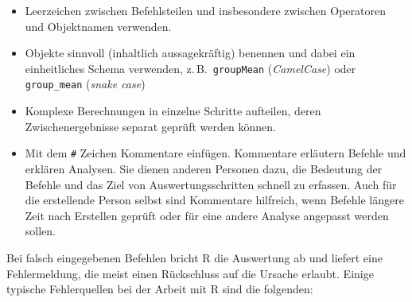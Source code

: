 \begin{itemize}
\item Leerzeichen zwischen Befehlsteilen und insbesondere zwischen Operatoren und Objektnamen verwenden.
\item Objekte sinnvoll (inhaltlich aussagekräftig) benennen und dabei ein einheitliches Schema verwenden, z.\,B.\ \lstinline!groupMean! (\emph{CamelCase}) oder \lstinline!group_mean! (\emph{snake case})
\item Komplexe Berechnungen in einzelne Schritte aufteilen, deren Zwischenergebnisse separat geprüft werden können.
\item Mit dem \lstinline!#! Zeichen Kommentare einfügen. Kommentare erläutern Befehle und erklären Analysen. Sie dienen anderen Personen dazu, die Bedeutung der Befehle und das Ziel von Auswertungsschritten schnell zu erfassen. Auch für die erstellende Person selbst sind Kommentare hilfreich, wenn Befehle längere Zeit nach Erstellen geprüft oder für eine andere Analyse angepasst werden sollen.
\end{itemize}

Bei falsch eingegebenen Befehlen bricht R die Auswertung ab und liefert eine Fehlermeldung, die meist einen Rückschluss auf die Ursache erlaubt. Einige typische Fehlerquellen bei der Arbeit mit R sind die folgenden:

